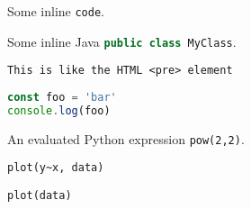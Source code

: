 %
%
%

Some inline \verb|code|.

Some inline Java \lstinline[language=Java]{public class MyClass}.

\begin{verbatim}
This is like the HTML <pre> element
\end{verbatim}

\begin{lstlisting}[language=js]
const foo = 'bar'
console.log(foo)
\end{lstlisting}


An evaluated Python expression \lstinline[language=python exec]{pow(2,2)}.

\begin{lstlisting}[language=r exec]
plot(y~x, data)
\end{lstlisting}

\begin{lstlisting}[language=r exec, caption={
    A plot of the data which hasd a mean of \lstinline[language=r exec]{ mean(data) }
}, label=fig2]
plot(data)
\end{lstlisting}
